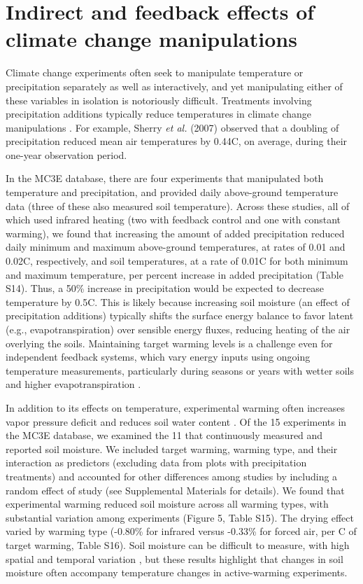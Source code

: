 \documentclass{article}
\begin{document}
\section* {Indirect and feedback effects of climate change manipulations} 
Climate change experiments often seek to manipulate temperature or precipitation separately as well as interactively, and yet manipulating either of these variables in isolation is notoriously difficult. Treatments involving precipitation additions typically reduce temperatures in climate change manipulations \citep{sherry2007,rollinson2012,mcdaniel2014}. For example, Sherry \emph{et al.} (2007) observed that a doubling of precipitation reduced mean air temperatures by 0.44\degree C, on average, during their one-year observation period. 
\par In the MC3E database, there are four experiments that manipulated both temperature and precipitation, and provided daily above-ground temperature data (three of these also measured soil temperature). Across these studies, all of which used infrared heating (two with feedback control and one with constant warming), we found that increasing the amount of added precipitation reduced daily minimum and maximum above-ground temperatures, at rates of 0.01 and 0.02\degree C, respectively, and soil temperatures, at a rate of 0.01\degree C for both minimum and maximum temperature, per percent increase in added precipitation (Table S14). Thus, a 50\% increase in precipitation would be expected to decrease temperature by 0.5\degree C.
This is likely because increasing soil moisture (an effect of precipitation additions) typically shifts the surface energy balance to favor latent (e.g., evapotranspiration) over sensible energy fluxes, reducing heating of the air overlying the soils. Maintaining target warming levels is a challenge even for independent feedback systems, which vary energy inputs using ongoing temperature measurements, particularly during seasons or years with wetter soils and higher evapotranspiration \citep{rich2015}.
\par In addition to its effects on temperature, experimental warming often increases vapor pressure deficit and reduces soil water content \citep[e.g.,][]{harte1995b,sherry2007,morin2010,pelini2014,templer2016}. Of the 15 experiments in the MC3E database, we examined the 11 that continuously measured and reported soil moisture. We included target warming, warming type, and their interaction as predictors (excluding data from plots with precipitation treatments) and accounted for other differences among studies by including a random effect of study (see Supplemental Materials for details). We found that experimental warming reduced soil moisture across all warming types, with substantial variation among experiments (Figure 5, Table S15). The drying effect varied by warming type (-0.80\% for infrared versus -0.33\% for forced air, per \degree C of target warming, Table S16). Soil moisture can be difficult to measure, with high spatial and temporal variation \citep{famiglietti1999,teuling2005}, but these results highlight that changes in soil moisture often accompany temperature changes in active-warming experiments.
\end{document}
